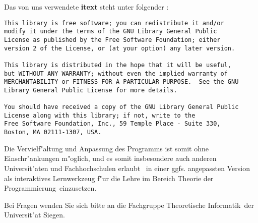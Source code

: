 Das von uns verwendete {\bf itext} steht unter folgender :

\begin{verbatim}
This library is free software; you can redistribute it and/or
modify it under the terms of the GNU Library General Public
License as published by the Free Software Foundation; either
version 2 of the License, or (at your option) any later version.

This library is distributed in the hope that it will be useful,
but WITHOUT ANY WARRANTY; without even the implied warranty of
MERCHANTABILITY or FITNESS FOR A PARTICULAR PURPOSE.  See the GNU
Library General Public License for more details.

You should have received a copy of the GNU Library General Public
License along with this library; if not, write to the
Free Software Foundation, Inc., 59 Temple Place - Suite 330,
Boston, MA 02111-1307, USA.
\end{verbatim}

Die Vervielf"altung und Anpassung des Programms ist somit ohne Einschr"ankungen m"oglich, und es somit insbesondere auch anderen Universit"aten und Fachhochschulen erlaubt \TPML\ in einer ggfs. angepassten
Version als interaktives Lernwerkzeug f"ur die Lehre im Bereich \glqq Theorie der Programmierung\grqq\ 
einzusetzen.

Bei Fragen wenden Sie sich bitte an die Fachgruppe \glqq Theoretische Informatik\grqq\ der Universit"at Siegen.



